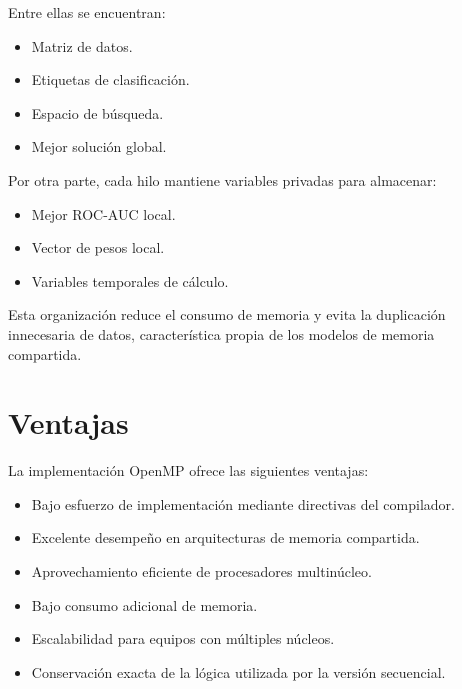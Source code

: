 Entre ellas se encuentran:

\begin{itemize}

\item Matriz de datos.

\item Etiquetas de clasificación.

\item Espacio de búsqueda.

\item Mejor solución global.

\end{itemize}

Por otra parte, cada hilo mantiene variables privadas para almacenar:

\begin{itemize}

\item Mejor ROC-AUC local.

\item Vector de pesos local.

\item Variables temporales de cálculo.

\end{itemize}

Esta organización reduce el consumo de memoria y evita la duplicación innecesaria de datos, característica propia de los modelos de memoria compartida.


\section{Ventajas}

La implementación OpenMP ofrece las siguientes ventajas:

\begin{itemize}

\item Bajo esfuerzo de implementación mediante directivas del compilador.

\item Excelente desempeño en arquitecturas de memoria compartida.

\item Aprovechamiento eficiente de procesadores multinúcleo.

\item Bajo consumo adicional de memoria.

\item Escalabilidad para equipos con múltiples núcleos.

\item Conservación exacta de la lógica utilizada por la versión secuencial.

\end{itemize}

